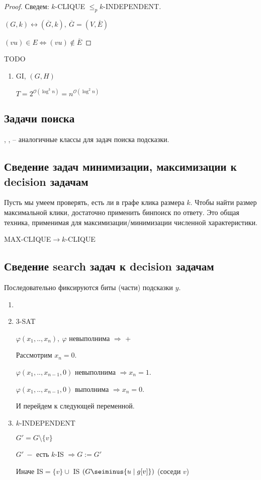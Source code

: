 \begin{proof}
    Сведем: $k$-CLIQUE $\leq_p k$-INDEPENDENT.

    $(G,k)\leftrightarrow (\overline{G},k),\ \overline{G}=(V,\overline{E})$

    $(vu)\in E\Leftrightarrow (vu)\notin \overline{E}$
\end{proof}

TODO

\begin{enumerate}
    \item GI, $(G,H)$

    $T=2^{\mathcal{O}(\log ^3n)}=n^{\mathcal{O}(\log^2n)}$
\end{enumerate}

\subsection{Задачи поиска}

\begin{definition}
    , ,  – аналогичные классы для задач поиска подсказки.
\end{definition}

\subsection*{Сведение задач минимизации, максимизации к decision задачам}
Пусть мы умеем проверять, есть ли в графе клика размера $k$. Чтобы найти размер максимальной клики, достаточно применить бинпоиск по ответу. Это общая техника, применимая для максимизации/минимизации численной характеристики.

MAX-CLIQUE$\rightarrow k$-CLIQUE

\subsection*{Сведение search задач к decision задачам}

Последовательно фиксируются биты (части) подсказки $y$.

\begin{example}
    \begin{enumerate}
        \item[]
        \item 3-SAT

        $\varphi(x_1,..,x_n),\ \varphi$ невыполнима $\Rightarrow$ +

        Рассмотрим $x_n=0$.

        $\varphi(x_1,..,x_{n-1},0)$ невыполнима $\Rightarrow x_n=1$.

        $\varphi(x_1,..,x_{n-1},0)$ выполнима $\Rightarrow x_n=0$.

        И перейдем к следующей переменной.
        \item $k$-INDEPENDENT

        $G'=G\setminus \{v\}$

        $G'\ -$ есть $k$-IS $\Rightarrow G:=G'$

        Иначе IS$=\{v\}\cup$ IS $(G\seiminus \{u\mid g[v]\})$ (соседи $v$)
    \end{enumerate}
\end{example}


